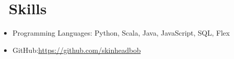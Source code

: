 \documentclass{resume}
\begin{document}

\section{\faCogs\ Skills}
\begin{itemize}[parsep=0.5ex]
  \item Programming Languages: Python, Scala, Java, JavaScript, SQL, Flex
  \item GitHub:\href{https://github.com/skinheadbob}{https://github.com/skinheadbob}
\end{itemize}

%
%
\end{document}
